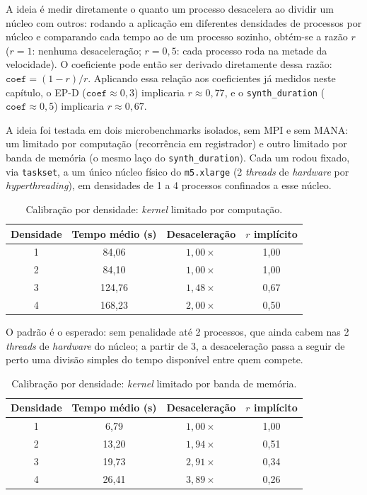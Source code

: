 A ideia é medir diretamente o quanto um processo desacelera ao dividir um núcleo
com outros: rodando a aplicação em diferentes densidades de processos por núcleo
e comparando cada tempo ao de um processo sozinho, obtém-se a razão $r$ ($r=1$:
nenhuma desaceleração; $r=0,5$: cada processo roda na metade da velocidade). O
coeficiente pode então ser derivado diretamente dessa razão:
$\texttt{coef} = (1-r)/r$. Aplicando essa relação aos coeficientes já medidos
neste capítulo, o EP-D ($\texttt{coef}\approx0,3$) implicaria $r\approx0,77$, e o
\texttt{synth\_duration} ($\texttt{coef}\approx0,5$) implicaria $r\approx0,67$.

A ideia foi testada em dois microbenchmarks isolados, sem MPI e sem MANA: um
limitado por computação (recorrência em registrador) e outro limitado por banda
de memória (o mesmo laço do \texttt{synth\_duration}). Cada um rodou fixado, via
\texttt{taskset}, a um único núcleo físico do \texttt{m5.xlarge} (2
\textit{threads} de \textit{hardware} por \textit{hyperthreading}), em
densidades de 1 a 4 processos confinados a esse núcleo.

\begin{table}[htb]
  \caption{Calibração por densidade: \textit{kernel} limitado por computação.}
  \label{tab:calib-cpu-bound}
  \centering
  \small
  \begin{tabular}{c c c c}
    \toprule
    Densidade & Tempo médio (s) & Desaceleração & $r$ implícito \\
    \midrule
    1 & 84,06  & $1,00\times$ & 1,00 \\
    2 & 84,10  & $1,00\times$ & 1,00 \\
    3 & 124,76 & $1,48\times$ & 0,67 \\
    4 & 168,23 & $2,00\times$ & 0,50 \\
    \bottomrule
  \end{tabular}
\end{table}

O padrão é o esperado: sem penalidade até 2 processos, que ainda cabem nas 2
\textit{threads} de \textit{hardware} do núcleo; a partir de 3, a desaceleração
passa a seguir de perto uma divisão simples do tempo disponível entre quem
compete.

\begin{table}[htb]
  \caption{Calibração por densidade: \textit{kernel} limitado por banda de memória.}
  \label{tab:calib-memory-bound}
  \centering
  \small
  \begin{tabular}{c c c c}
    \toprule
    Densidade & Tempo médio (s) & Desaceleração & $r$ implícito \\
    \midrule
    1 & 6,79  & $1,00\times$ & 1,00 \\
    2 & 13,20 & $1,94\times$ & 0,51 \\
    3 & 19,73 & $2,91\times$ & 0,34 \\
    4 & 26,41 & $3,89\times$ & 0,26 \\
    \bottomrule
  \end{tabular}
\end{table}


